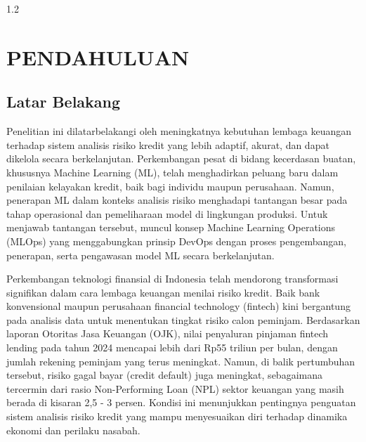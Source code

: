 
\begin{spacing}{1.2}
  \chapter{PENDAHULUAN}
\end{spacing}


\vspace{4ex}

\section{Latar Belakang}
Penelitian ini dilatarbelakangi oleh meningkatnya kebutuhan lembaga keuangan terhadap sistem analisis risiko kredit yang lebih adaptif, akurat, dan dapat dikelola secara berkelanjutan. Perkembangan pesat di bidang kecerdasan buatan, khususnya Machine Learning (ML), telah menghadirkan peluang baru dalam penilaian kelayakan kredit, baik bagi individu maupun perusahaan. Namun, penerapan ML dalam konteks analisis risiko menghadapi tantangan besar pada tahap operasional dan pemeliharaan model di lingkungan produksi. Untuk menjawab tantangan tersebut, muncul konsep Machine Learning Operations (MLOps) yang menggabungkan prinsip DevOps dengan proses pengembangan, penerapan, serta pengawasan model ML secara berkelanjutan.\cite{google2024mlops}

Perkembangan teknologi finansial di Indonesia telah mendorong transformasi signifikan dalam cara lembaga keuangan menilai risiko kredit. Baik bank konvensional maupun perusahaan financial technology (fintech) kini bergantung pada analisis data untuk menentukan tingkat risiko calon peminjam. Berdasarkan laporan Otoritas Jasa Keuangan (OJK), nilai penyaluran pinjaman fintech lending pada tahun 2024 mencapai lebih dari Rp55 triliun per bulan, dengan jumlah rekening peminjam yang terus meningkat. Namun, di balik pertumbuhan tersebut, risiko gagal bayar (credit default) juga meningkat, sebagaimana tercermin dari rasio Non-Performing Loan (NPL) sektor keuangan yang masih berada di kisaran 2,5 - 3 persen.\cite{ojk2024pojk29} Kondisi ini menunjukkan pentingnya penguatan sistem analisis risiko kredit yang mampu menyesuaikan diri terhadap dinamika ekonomi dan perilaku nasabah.


